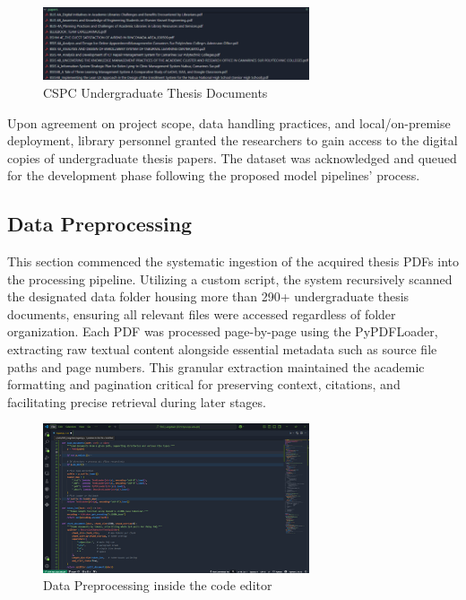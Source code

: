 \begin{refsection}
\begin{figure}[h]
    \centering
    \includegraphics[width=0.7\textwidth]{figures/tsis_docs.png}
    \caption{CSPC Undergraduate Thesis Documents}
\end{figure}

Upon agreement on project scope, data handling practices, and local/on-premise deployment, library personnel granted the researchers to gain access to the digital copies of undergraduate thesis papers. The dataset was acknowledged and queued for the development phase following the proposed model pipelines’ process.

\subsection{Data Preprocessing}
This section commenced the systematic ingestion of the acquired thesis PDFs into the processing pipeline. Utilizing a custom script, the system recursively scanned the designated data folder housing more than 290+ undergraduate thesis documents, ensuring all relevant files were accessed regardless of folder organization. Each PDF was processed page-by-page using the PyPDFLoader, extracting raw textual content alongside essential metadata such as source file paths and page numbers. This granular extraction maintained the academic formatting and pagination critical for preserving context, citations, and facilitating precise retrieval during later stages.

\begin{figure}[h]
    \centering
    \includegraphics[width=0.7\textwidth]{figures/dtprprcss.png}
    \caption{Data Preprocessing inside the code editor}
\end{figure}


\end{refsection}
